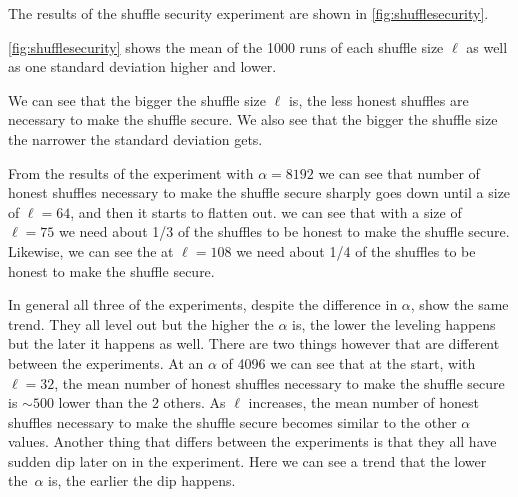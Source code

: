 The results of the shuffle security experiment are shown in \autoref{fig:shufflesecurity}.

\autoref{fig:shufflesecurity} shows the mean of the 1000 runs of each shuffle size $\ell$ as well as one standard deviation higher and lower.

We can see that the bigger the shuffle size $\ell$ is, the less honest shuffles are necessary to make the shuffle secure.
We also see that the bigger the shuffle size the narrower the standard deviation gets.

From the results of the experiment with $\alpha=8192$ we can see that number of honest shuffles necessary to make the shuffle secure sharply goes down until a size of $\ell=64$, and then it starts to flatten out.
we can see that with a size of $\ell=75$ we need about 1/3 of the shuffles to be honest to make the shuffle secure.
Likewise, we can see the at $\ell=108$ we need about 1/4 of the shuffles to be honest to make the shuffle secure.

In general all three of the experiments, despite the difference in $\alpha$, show the same trend.
They all level out but the higher the $\alpha$ is, the lower the leveling happens but the later it happens as well.
There are two things however that are different between the experiments.
At an $\alpha$ of 4096 we can see that at the start, with $\ell=32$, the mean number of honest shuffles necessary to make the shuffle secure is $\sim500$ lower than the 2 others.
As $\ell$ increases, the mean number of honest shuffles necessary to make the shuffle secure becomes similar to the other $\alpha$ values.
Another thing that differs between the experiments is that they all have sudden dip later on in the experiment.
Here we can see a trend that the lower the~$\alpha$ is, the earlier the dip happens.